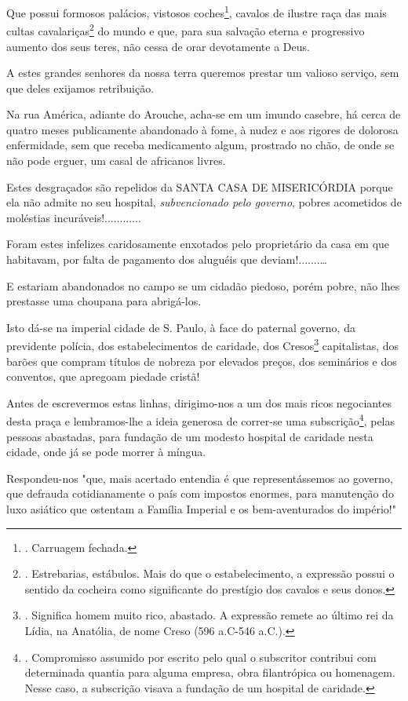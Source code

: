 Que possui formosos palácios, vistosos coches\footnote{. Carruagem
  fechada.}, cavalos de ilustre raça das mais cultas
cavalariças\footnote{. Estrebarias, estábulos. Mais do que o
  estabelecimento, a expressão possui o sentido da cocheira como
  significante do prestígio dos cavalos e seus donos.} do mundo e que,
para sua salvação eterna e progressivo aumento dos seus teres, não cessa
de orar devotamente a Deus.

A estes grandes senhores da nossa terra queremos prestar um valioso
serviço, sem que deles exijamos retribuição.

Na rua América, adiante do Arouche, acha-se em um imundo casebre, há
cerca de quatro meses publicamente abandonado à fome, à nudez e aos
rigores de dolorosa enfermidade, sem que receba medicamento algum,
prostrado no chão, de onde se não pode erguer, um casal de africanos
livres.

Estes desgraçados são repelidos da SANTA CASA DE MISERICÓRDIA porque ela
não admite no seu hospital, \emph{subvencionado pelo governo}, pobres
acometidos de moléstias incuráveis!............

Foram estes infelizes caridosamente enxotados pelo proprietário da casa
em que habitavam, por falta de pagamento dos aluguéis que
deviam!.......\ldots{}

E estariam abandonados no campo se um cidadão piedoso, porém pobre, não
lhes prestasse uma choupana para abrigá-los.

Isto dá-se na imperial cidade de S. Paulo, à face do paternal governo,
da previdente polícia, dos estabelecimentos de caridade, dos
Cresos\footnote{. Significa homem muito rico, abastado. A expressão
  remete ao último rei da Lídia, na Anatólia, de nome Creso (596 a.C-546
  a.C.).} capitalistas, dos barões que compram títulos de nobreza por
elevados preços, dos seminários e dos conventos, que apregoam piedade
cristã!

Antes de escrevermos estas linhas, dirigimo-nos a um dos mais ricos
negociantes desta praça e lembramos-lhe a ideia generosa de correr-se
uma subscrição\footnote{. Compromisso assumido por escrito pelo qual o
  subscritor contribui com determinada quantia para alguma empresa, obra
  filantrópica ou homenagem. Nesse caso, a subscrição visava a fundação
  de um hospital de caridade.}, pelas pessoas abastadas, para fundação
de um modesto hospital de caridade nesta cidade, onde já se pode morrer
à míngua.

Respondeu-nos "que, mais acertado entendia é que representássemos ao
governo, que defrauda cotidianamente o país com impostos enormes, para
manutenção do luxo asiático que ostentam a Família Imperial e os
bem-aventurados do império!"

